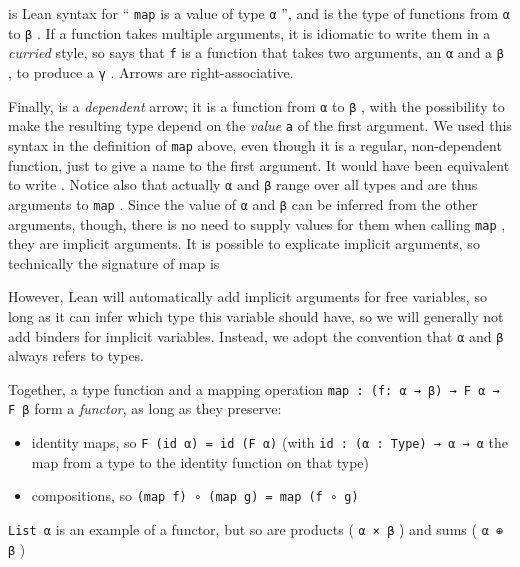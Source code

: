 \documentclass[titlepage]{report}
\newenvironment{remark}{%
\begin{framed}
\begin{trivlist}
    \item[\hskip \labelsep {\bfseries Remark:}]}%
{%
\end{trivlist}%
\end{framed}
}
\newcommand\lean[1]{{%
\def\leanmode{1}%
\small \texttt{#1}%
\undef\leanmode%
}}
\begin{document}
\begin{remark}
     is Lean syntax for ``\lean{map} is a value of type \lean{α}'', and  is the type of functions from \lean{α} to \lean{β}. 
    If a function takes multiple arguments, it is idiomatic to write them in a \emph{curried} style,
    so  says that \lean{f} is a function that takes two arguments, an \lean{α} and a \lean{β}, to produce a \lean{γ}. Arrows are right-associative.

    Finally,  is a \emph{dependent} arrow; it is a function from \lean{α} to \lean{β}, with the possibility to make the resulting type depend on the \emph{value} \lean{a} of the first argument. 
    We used this syntax in the definition of \lean{map} above, even though it is a regular, non-dependent function, just to give a name to the first argument. 
    It would have been equivalent to write .
    Notice also that actually \lean{α} and \lean{β} range over all types and are thus arguments to \lean{map}. Since the value of \lean{α} and \lean{β} can be inferred from the other arguments, though, there is no need to supply values for them when calling \lean{map}, they are implicit arguments. It is possible to explicate implicit arguments, so technically the signature of map is 
    \begin{center}
    \end{center}
    However, Lean will automatically add implicit arguments for free variables, so long as it can infer which type this variable should have, so we will generally not add binders for implicit variables. Instead, we adopt the convention that \lean{α} and \lean{β} always refers to types. 
\end{remark}

Together, a type function  and a mapping operation \lean{map : (f: α → β) → F α → F β} form a \emph{functor}, as long as they preserve: 
\begin{itemize}
    \item identity maps, so \lean{F (id α) = id (F α)} (with \lean{id : (α : Type) → α → α} the map from a type to the identity function on that type)
    \item compositions, so \lean{(map f) ∘ (map g) = map (f ∘ g)}
\end{itemize}
\lean{List α} is an example of a functor, but so are products (\lean{α × β}) and sums 
(\lean{α ⊕ β})
\end{document}
